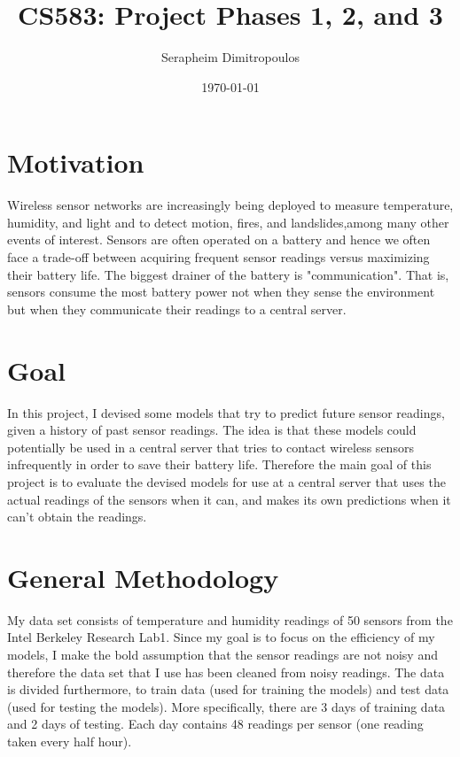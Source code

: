 \documentclass{article}
\title{CS583: Project Phases 1, 2, and 3}
\date{\today}
\author{Serapheim Dimitropoulos}
\begin{document}
\maketitle

\section{Motivation}

Wireless sensor networks are increasingly being deployed
to measure temperature, humidity, and light and to detect
motion, fires, and landslides,among many other events of
interest. Sensors are often operated on a battery and hence
we often face a trade-off between acquiring frequent sensor
readings versus maximizing their battery life. The biggest
drainer of the battery is "communication". That is, sensors
consume the most battery power not when they sense the
environment but when they communicate their readings to a
central server.

\section{Goal}

In this project, I devised some models that try to predict
future sensor readings, given a history of past sensor
readings. The idea is that these models could potentially
be used in a central server that tries to contact
wireless sensors infrequently in order to save their
battery life. Therefore the main goal of this project
is to evaluate the devised models for use at a central
server that uses the actual readings of the sensors when
it can, and makes its own predictions when it can't
obtain the readings.

\section{General Methodology}

My data set consists of temperature and humidity readings
of 50 sensors from the Intel Berkeley Research Lab1. Since
my goal is to focus on the efficiency of my models, I make
the bold assumption that the sensor readings are not noisy
and therefore the data set that I use has been cleaned from
noisy readings. The data is divided furthermore, to train
data (used for training the models) and test data (used for
testing the models). More specifically, there are 3 days
of training data and 2 days of testing. Each day contains
48 readings per sensor (one reading taken every half hour).
\end{document}
